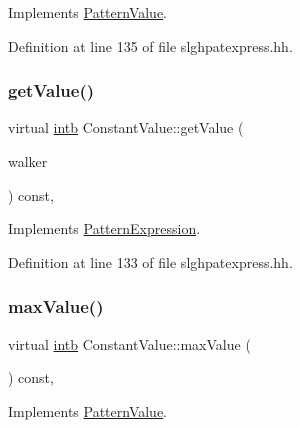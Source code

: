 Implements \mbox{\hyperlink{class_pattern_value_acc5a0c3b740a93e6ed5d3882c960ef98}{Pattern\+Value}}.



Definition at line 135 of file slghpatexpress.\+hh.

\mbox{\label{class_constant_value_ab43cd9c5b588e2b748bfeecb8ccc0fef}} 
\subsubsection{\texorpdfstring{getValue()}{getValue()}}
{\footnotesize\ttfamily virtual \mbox{\hyperlink{types_8h_aa925ba3e627c2df89d5b1cfe84fb8572}{intb}} Constant\+Value\+::get\+Value (\begin{DoxyParamCaption}\item[{\mbox{\hyperlink{class_parser_walker}{Parser\+Walker}} \&}]{walker }\end{DoxyParamCaption}) const\hspace{0.3cm}{\ttfamily [inline]}, {\ttfamily [virtual]}}



Implements \mbox{\hyperlink{class_pattern_expression_a8332c6ea4c5a7e9dfc690df2a6458bb8}{Pattern\+Expression}}.



Definition at line 133 of file slghpatexpress.\+hh.

\mbox{\label{class_constant_value_aa212eac1ed40169d08155c7fd83224e2}} 
\subsubsection{\texorpdfstring{maxValue()}{maxValue()}}
{\footnotesize\ttfamily virtual \mbox{\hyperlink{types_8h_aa925ba3e627c2df89d5b1cfe84fb8572}{intb}} Constant\+Value\+::max\+Value (\begin{DoxyParamCaption}\item[{void}]{ }\end{DoxyParamCaption}) const\hspace{0.3cm}{\ttfamily [inline]}, {\ttfamily [virtual]}}



Implements \mbox{\hyperlink{class_pattern_value_a865e8f34e031ef31f77dcaa93d76820d}{Pattern\+Value}}.



